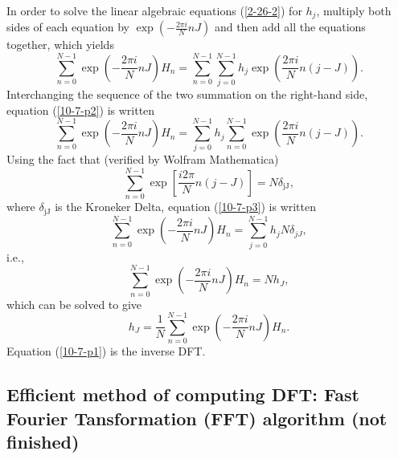 \documentclass{article}
\newcommand{\tmop}[1]{\ensuremath{\operatorname{#1}}}
\begin{document}
In order to solve the linear algebraic equations (\ref{2-26-2}) for $h_j$,
multiply both sides of each equation by $\exp \left( - \frac{2 \pi i}{N} n J
\right)$ and then add all the equations together, which yields
\begin{equation}
  \label{10-7-p2} \sum_{n = 0}^{N - 1} \exp \left( - \frac{2 \pi i}{N} n J
  \right) H_n = \sum_{n = 0}^{N - 1} \sum_{j = 0}^{N - 1} h_j \exp \left(
  \frac{2 \pi i}{N} n (j - J) \right) .
\end{equation}
Interchanging the sequence of the two summation on the right-hand side,
equation (\ref{10-7-p2}) is written
\begin{equation}
  \label{10-7-p3} \sum_{n = 0}^{N - 1} \exp \left( - \frac{2 \pi i}{N} n J
  \right) H_n = \sum_{j = 0}^{N - 1} h_j \sum_{n = 0}^{N - 1} \exp \left(
  \frac{2 \pi i}{N} n (j - J) \right) .
\end{equation}
Using the fact that (verified by Wolfram Mathematica)
\begin{equation}
  \sum_{n = 0}^{N - 1} \exp \left[ \frac{i 2 \pi}{N} n (j - J) \right] = N
  \delta_{\tmop{jJ}},
\end{equation}
where $\delta_{\tmop{jJ}}$ is the Kroneker Delta, equation (\ref{10-7-p3}) is
written
\begin{equation}
  \sum_{n = 0}^{N - 1} \exp \left( - \frac{2 \pi i}{N} n J \right) H_n =
  \sum_{j = 0}^{N - 1} h_j N \delta_{j J},
\end{equation}
i.e.,
\begin{equation}
  \sum_{n = 0}^{N - 1} \exp \left( - \frac{2 \pi i}{N} n J \right) H_n = N
  h_J,
\end{equation}
which can be solved to give
\begin{equation}
  \label{10-7-p1} h_J = \frac{1}{N} \sum_{n = 0}^{N - 1} \exp \left( - \frac{2
  \pi i}{N} n J \right) H_n .
\end{equation}
Equation (\ref{10-7-p1}) is the inverse DFT.

\subsection{Efficient method of computing DFT: Fast Fourier Tansformation
(FFT) algorithm (not finished)}\label{18-1-28-a1}
\end{document}
